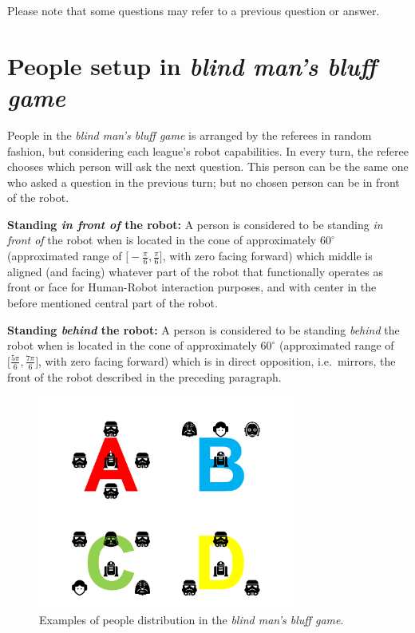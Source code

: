 Please note that some questions may refer to a previous question or answer.

\section{People setup in \textit{blind man's bluff game}}
People in the \textit{blind man's bluff game} is arranged by the referees in random fashion, but considering each league's robot capabilities. In every turn, the referee chooses which person will ask the next question. This person can be the same one who asked a question in the previous turn; but no chosen person can be in front of the robot.

\textbf{Standing \textit{in front of} the robot:} A person is considered to be standing \textit{in front of} the robot when is located in the cone of approximately $60^{\circ}$ (approximated range of $\big[-\frac{\pi}{6}, \frac{\pi}{6}\big]$, with zero facing forward) which middle is aligned (and facing) whatever part of the robot that functionally operates as front or face for Human-Robot interaction purposes, and with center in the before mentioned central part of the robot.

\textbf{Standing \textit{behind} the robot:} A person is considered to be standing \textit{behind} the robot when is located in the cone of approximately $60^{\circ}$ (approximated range of $\big[\frac{5\pi}{6}, \frac{7\pi}{6}\big]$, with zero facing forward) which is in direct opposition, i.e.~mirrors, the front of the robot described in the preceding paragraph.

\begin{figure}[H]
    \begin{center}
        \includegraphics[width=0.75\textwidth]{images/spr_ppl_layout.png}
        \vspace{-10pt}
        \caption{Examples of people distribution in the \textit{blind man's bluff game}.}
        \label{fig:spr-ppl-layout}
    \end{center}
\end{figure}

